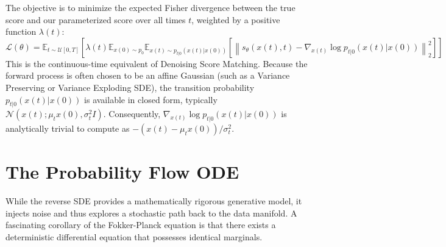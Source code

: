The objective is to minimize the expected Fisher divergence between the true score and our parameterized score over all times $t$, weighted by a positive function $\lambda(t)$:
\begin{equation}
\mathcal{L}(\theta) = \mathbb{E}_{t \sim \mathcal{U}[0,T]} \left[ \lambda(t) \mathbb{E}_{x(0) \sim p_0} \mathbb{E}_{x(t) \sim p_{t|0}(x(t)|x(0))} \left[ \left\lVert s_\theta(x(t), t) - \nabla_{x(t)} \log p_{t|0}(x(t) | x(0)) \right\rVert_2^2 \right] \right]
\end{equation}
This is the continuous-time equivalent of Denoising Score Matching. Because the forward process is often chosen to be an affine Gaussian (such as a Variance Preserving or Variance Exploding SDE), the transition probability $p_{t|0}(x(t) | x(0))$ is available in closed form, typically $\mathcal{N}(x(t); \mu_t x(0), \sigma_t^2 I)$. Consequently, $\nabla_{x(t)} \log p_{t|0}(x(t) | x(0))$ is analytically trivial to compute as $-(x(t) - \mu_t x(0)) / \sigma_t^2$.


\section{The Probability Flow ODE}

While the reverse SDE provides a mathematically rigorous generative model, it injects noise and thus explores a stochastic path back to the data manifold. A fascinating corollary of the Fokker-Planck equation is that there exists a deterministic differential equation that possesses identical marginals.

